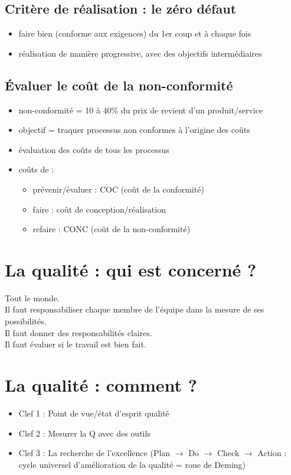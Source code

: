 		\subsection{Critère de réalisation : le zéro défaut}
			\begin{itemize}
			\item faire bien (conforme aux exigences) du 1er coup et à chaque fois
			\item réalisation de manière progressive, avec des objectifs intermédiaires
			\end{itemize}
		\subsection{Évaluer le coût de la non-conformité}
			\begin{itemize}
			\item non-conformité = 10 à 40\% du prix de revient d’un produit/service
			\item objectif = traquer processus non conformes à l’origine des coûts
			\item évaluation des coûts de tous les processus
			\item coûts de : 
				\begin{itemize}
				\item prévenir/évaluer : COC (coût de la conformité)
				\item faire : coût de conception/réalisation
				\item refaire : CONC (coût de la non-conformité)	
				\end{itemize}
			\end{itemize}
	
	\section{La qualité : qui est concerné ?}
		Tout le monde. \\
		Il faut responsabiliser chaque membre de l’équipe dans la mesure de ses possibilités. \\
		Il faut donner des responsabilités claires. \\
		Il faut évaluer si le travail est bien fait. \\
	
	\section{La qualité : comment ?}
		\begin{itemize}
		\item Clef 1 : Point de vue/état d’esprit qualité
		\item Clef 2 : Mesurer la Q avec des outils 
		\item Clef 3 : La recherche de l’excellence (Plan $\rightarrow$ Do $\rightarrow$ Check $\rightarrow$ Action : cycle universel d’amélioration de la qualité = roue de Deming)
		\end{itemize}

